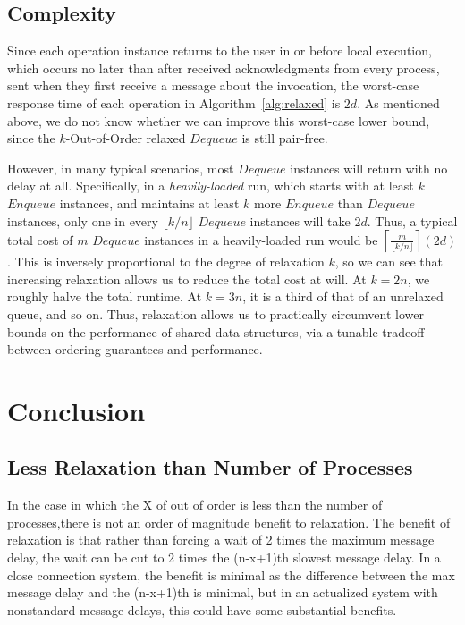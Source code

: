 \documentclass[a4paper,anonymous,USenglish]{lipics-v2021} %
\theoremstyle{definition}
\begin{document}
\subsection{Complexity}

Since each operation instance returns to the user in or before local execution, which occurs no later than after received acknowledgments from every process, sent when they first receive a message about the invocation, the worst-case response time of each operation in Algorithm~\ref{alg:relaxed} is $2d$.  As mentioned above, we do not know whether we can improve this worst-case lower bound, since the $k$-Out-of-Order relaxed $Dequeue$ is still pair-free.

However, in many typical scenarios, most $Dequeue$ instances will return with no delay at all.  Specifically, in a \emph{heavily-loaded} run, which starts with at least $k$ $Enqueue$ instances, and maintains at least $k$ more $Enqueue$ than $Dequeue$ instances, only one in every $\lfloor k/n\rfloor$ $Dequeue$ instances will take $2d$.  Thus, a typical total cost of $m$ $Dequeue$ instances in a heavily-loaded run would be $\left\lceil\frac{m}{\lfloor k/n\rfloor}\right\rceil(2d)$.  This is inversely proportional to the degree of relaxation $k$, so we can see that increasing relaxation allows us to reduce the total cost at will.  At $k=2n$, we roughly halve the total runtime.  At $k=3n$, it is a third of that of an unrelaxed queue, and so on.  Thus, relaxation allows us to practically circumvent lower bounds on the performance of shared data structures, via a tunable tradeoff between ordering guarantees and performance.

\section{Conclusion}

\subsection{Less Relaxation than Number of Processes}
In the case in which the X of out of order is less than the number of processes,there is not an order of magnitude benefit to relaxation. The benefit of relaxation is that rather than forcing a wait of 2 times the maximum message delay, the wait can be cut to 2 times the (n-x+1)th slowest message delay. In a close connection system, the benefit is minimal as the difference between the max message delay and the (n-x+1)th is minimal, but in an actualized system with nonstandard message delays, this could have some substantial benefits.



\end{document}
